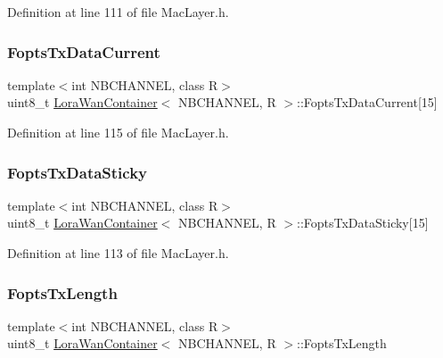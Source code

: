 Definition at line 111 of file Mac\+Layer.\+h.

\mbox{\label{class_lora_wan_container_a55fd2a924f9e9c32a2567c4f6f8fe661}} 
\subsubsection{\texorpdfstring{Fopts\+Tx\+Data\+Current}{FoptsTxDataCurrent}}
{\footnotesize\ttfamily template$<$int N\+B\+C\+H\+A\+N\+N\+EL, class R$>$ \\
uint8\+\_\+t \mbox{\hyperlink{class_lora_wan_container}{Lora\+Wan\+Container}}$<$ N\+B\+C\+H\+A\+N\+N\+EL, R $>$\+::Fopts\+Tx\+Data\+Current\mbox{[}15\mbox{]}}



Definition at line 115 of file Mac\+Layer.\+h.

\mbox{\label{class_lora_wan_container_aad9ee7e5a686fea5aac63e7fd0b4d3b2}} 
\subsubsection{\texorpdfstring{Fopts\+Tx\+Data\+Sticky}{FoptsTxDataSticky}}
{\footnotesize\ttfamily template$<$int N\+B\+C\+H\+A\+N\+N\+EL, class R$>$ \\
uint8\+\_\+t \mbox{\hyperlink{class_lora_wan_container}{Lora\+Wan\+Container}}$<$ N\+B\+C\+H\+A\+N\+N\+EL, R $>$\+::Fopts\+Tx\+Data\+Sticky\mbox{[}15\mbox{]}}



Definition at line 113 of file Mac\+Layer.\+h.

\mbox{\label{class_lora_wan_container_ab30ac450a53d4591f9555e081c1e6f25}} 
\subsubsection{\texorpdfstring{Fopts\+Tx\+Length}{FoptsTxLength}}
{\footnotesize\ttfamily template$<$int N\+B\+C\+H\+A\+N\+N\+EL, class R$>$ \\
uint8\+\_\+t \mbox{\hyperlink{class_lora_wan_container}{Lora\+Wan\+Container}}$<$ N\+B\+C\+H\+A\+N\+N\+EL, R $>$\+::Fopts\+Tx\+Length}



